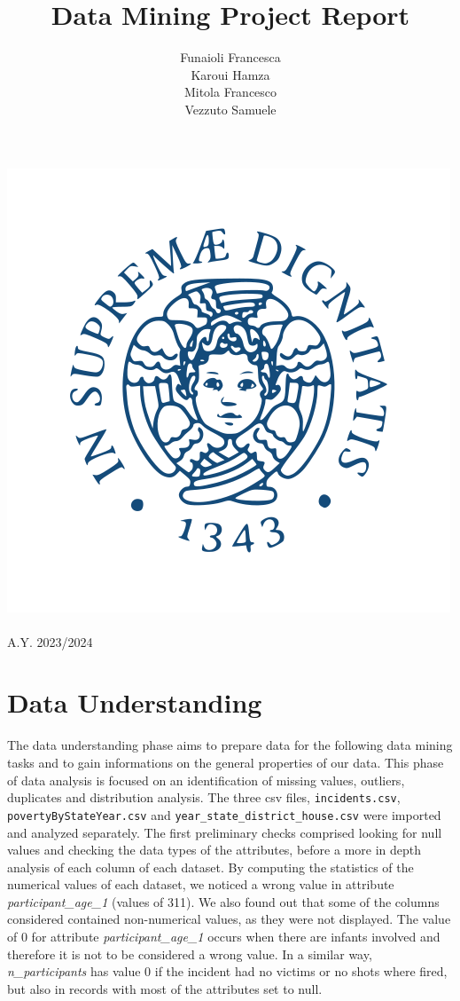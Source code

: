\documentclass[11pt,a4paper]{report}
\title{\huge{\textbf{Data Mining Project Report}}}
\author{Funaioli Francesca\\
Karoui Hamza\\
Mitola Francesco\\
Vezzuto Samuele\\
}
\begin{document}
\makeatletter
\begin{titlepage}
	\begin{center}
		\includegraphics[width=0.4\linewidth]{unipi}\\[4ex]
		{\huge \bfseries  \@title }\\[2ex]
		{\Large A.Y. 2023/2024 }\\[6ex]
		{\large  \@author}
	\end{center}
\end{titlepage}
\makeatother

\tableofcontents

\chapter{Data Understanding}

The data understanding phase aims to prepare data for the following data mining tasks and to gain informations on the general properties of our data.
This phase of data analysis is focused on an identification of missing values, outliers, duplicates and distribution analysis.
The three csv files, \texttt{incidents.csv}, \texttt{povertyByStateYear.csv} and \texttt{year\_state\_district\_house.csv} were imported and analyzed separately.
The first preliminary checks comprised looking for null values and checking the data types of the attributes, before a more in depth analysis of each column of each dataset.
By computing the statistics of the numerical values of each dataset, we noticed a wrong value in attribute \textit{participant\_age\_1} (values of 311).
We also found out that some of the columns considered contained non-numerical values, as they were not displayed.
The value of 0 for attribute \textit{participant\_age\_1} occurs when there are infants involved and therefore it is not to be considered a wrong value.
In a similar way, \textit{n\_participants} has value 0 if the incident had no victims or no shots where fired, but also in records with most of the attributes set to null.
\end{document}

